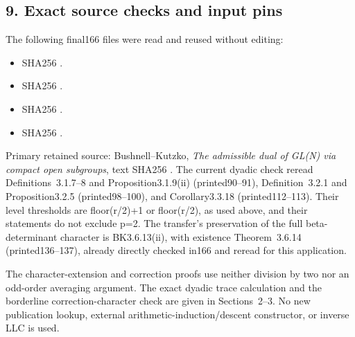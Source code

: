 \hypertarget{dyadic_character-exact-source-checks-and-input-pins}{%
\subsection{9. Exact source checks and input
pins}\label{dyadic_character-exact-source-checks-and-input-pins}}

The following final166 files were read and reused without editing:

\begin{itemize}
\tightlist
\item
  SHA256
  .
\item
   SHA256
  .
\item
   SHA256
  .
\item
   SHA256
  .
\end{itemize}

Primary retained source: Bushnell--Kutzko, \emph{The admissible dual of
GL(N) via compact open subgroups}, text SHA256
.
The current dyadic check reread Definitions~3.1.7--8 and
Proposition3.1.9(ii) (printed90--91), Definition~3.2.1 and
Proposition3.2.5 (printed98--100), and Corollary3.3.18
(printed112--113). Their level thresholds are floor(r/2)+1 or
floor(r/2), as used above, and their statements do not exclude p=2. The
transfer's preservation of the full beta-determinant character is
BK3.6.13(ii), with existence Theorem~3.6.14 (printed136--137), already
directly checked in166 and reread for this application.

The character-extension and correction proofs use neither division by
two nor an odd-order averaging argument. The exact dyadic trace
calculation and the borderline correction-character check are given in
Sections~2--3. No new publication lookup, external
arithmetic-induction/descent constructor, or inverse LLC is used.

